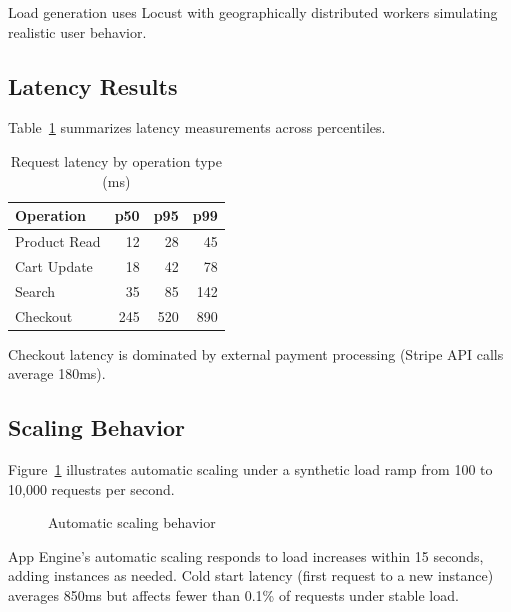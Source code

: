 \documentclass[11pt,twocolumn]{article}
\begin{document}
Load generation uses Locust with geographically distributed workers simulating realistic user behavior.

\subsection{Latency Results}

Table~\ref{tab:latency} summarizes latency measurements across percentiles.

\begin{table}[h]
\centering
\caption{Request latency by operation type (ms)}
\label{tab:latency}
\begin{tabular}{lrrr}
\hline
Operation & p50 & p95 & p99 \\
\hline
Product Read & 12 & 28 & 45 \\
Cart Update & 18 & 42 & 78 \\
Search & 35 & 85 & 142 \\
Checkout & 245 & 520 & 890 \\
\hline
\end{tabular}
\end{table}

Checkout latency is dominated by external payment processing (Stripe API calls average 180ms).

\subsection{Scaling Behavior}

Figure~\ref{fig:scaling} illustrates automatic scaling under a synthetic load ramp from 100 to 10,000 requests per second.

\begin{figure}[h]
\centering
{}
\caption{Automatic scaling behavior}
\label{fig:scaling}
\end{figure}

App Engine's automatic scaling responds to load increases within 15 seconds, adding instances as needed. Cold start latency (first request to a new instance) averages 850ms but affects fewer than 0.1\% of requests under stable load.
\end{document}
